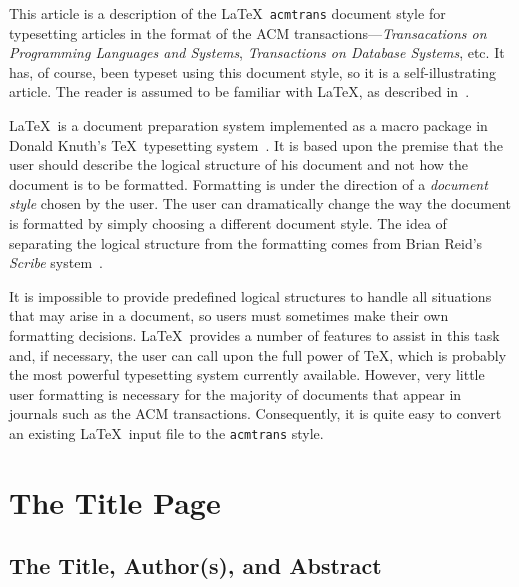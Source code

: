 This article is a description of the \LaTeX\ {\tt acmtrans} document
style for typesetting articles in the format of the ACM
transactions---{\em Transacations on Programming Languages and
Systems}, {\em Transactions on Database Systems}, etc.  It has, of
course, been typeset using this document style, so it is a
self-illustrating article.  The reader is assumed to be familiar
with \LaTeX, as described in~\cite{lamport:latex}.

\LaTeX\ is a document preparation system
implemented as a macro package in Donald Knuth's
\TeX\ typesetting system~\cite{knuth:texbook}.  It is based
upon the premise that the user should describe the logical structure of
his document and not how the document is to be formatted.  Formatting
is under the direction of a {\em document style} chosen by the user.
The user can dramatically change the way the document is formatted by
simply choosing a different document style.  The idea of separating the
logical structure from the formatting comes from Brian Reid's {\em
Scribe\/} system~\cite{reid:scribe}.  

It is impossible to provide predefined logical structures to handle all
situations that may arise in a document, so users must sometimes make
their own formatting decisions.  \LaTeX\ provides a number of features
to assist in this task and, if necessary, the user can call upon the
full power of \TeX, which is probably the most powerful typesetting
system currently available.  However, very little user formatting is
necessary for the majority of documents that appear in journals such as
the ACM transactions.  Consequently, it is quite easy to convert
an existing \LaTeX\ input file to the {\tt acmtrans} style.

\section{The Title Page}

\subsection{The Title, Author(s), and Abstract}

